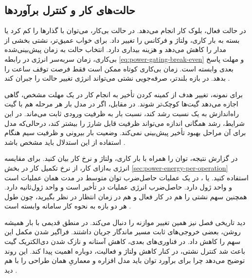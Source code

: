 \subsection{حالت‌های کار و کنترل برآوردها}
\label{sec:power-management-modes}

در حالت فعال، بلوک کار انجام می‌دهد. در حالت بی‌کار، می‌توان با
 گذارها را کم کرد یا بسته به بار کاری، ولتاژ و
فرکانس را تغییر داد. برای خواب عمیق‌تر،  نشتی
بخشی از مدار را کاهش می‌دهد و هزینه بیداری دارد. انتخاب حالت به
زمان پیش‌بینی‌شده بی‌کاری، زمان سربه‌سر انرژی در رابطه
\eqref{eq:power-gating-break-even} و مهلت پاسخ بعدی وابسته است.
زمان بی‌کاری کوتاه ممکن است فقط فرصت توقف ساعت را بدهد. در بازه
بلندتر، صرفه‌جویی نشتی می‌تواند انرژی تغییر حالت را جبران کند
\cite[بخش ، صفحات ۲۰۵ و ۲۰۶]{weste}.

برای نمونه، تغییر هدف از کمینه کردن تأخیر به انجام کار در یک
مهلت مشخص، گاهی اجازه می‌دهد گیت‌ها کوچک‌تر شوند. در مقابل، اگر
در مدل  بار هر مرحله هم با گیت راه‌اندازش
به یک نسبت رشد کند، نسبت بار به ظرفیت ورودی ثابت می‌ماند. در این
شرایط، رشد همگانی اندازه می‌تواند ظرفیت قابل شارژ را بیشتر کند،
درحالی‌که مدل برای آن مراحل بهبود تأخیر پیش‌بینی نمی‌کند. وضعیت
بار بیرونی و ظرفیت سیم هنگام استفاده از این استدلال باید مشخص باشد
\cite[بخش ، صفحه ۲۰۶]{weste}.

در گزارش نتیجه، توان را همراه با بار کاری، ولتاژ و نرخ کار بیان
کنید. برای مقایسه انرژی به‌ازای کار، از نرخ تکمیل کار در بخش
\ref{sec:power-energy-per-operation} استفاده کنید.
 یا ، در یک عملیات حاصل‌ضرب توان
متوسط در مدت همان عملیات است و واحد ژول دارد.  حاصل‌ضرب
انرژی عملیات در تأخیر است و واحد ژول‌ثانیه دارد. همچنین سهم
نشتی را هم در کار فعال و هم در زمان انتظار در نظر بگیرید، چون
طول هر دو بازه به نحوه کار سامانه وابسته است
\cite[بخش ، صفحه ۲۰۶]{weste}.

دید تاریخی فصل  نیز همین تغییر موازنه را دنبال می‌کند.
در منطق قدیمی  با بار همیشه روشن، بعضی خروجی‌های ثابت
مسیر ماندگار جریان داشتند. فراگیر شدن  مکمل این سهم را
کاهش داد. در فناوری‌های بعدی، کاهش آستانه و نازک شدن دی‌الکتریک
گیت باعث شد کنترل نشتی، در کنار کاهش ولتاژ و فعالیت، دوباره اهمیت
پیدا کند. این روند توضیح می‌دهد چرا برای برآورد توان باید مدل
افزاره و معماریِ همان طراحی را با هم دید
\cite[بخش ، صفحات ۲۰۷ و ۲۰۸]{weste}.
